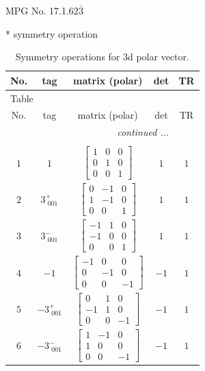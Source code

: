 \documentclass[fleqn,8pt]{jsarticle}
\begin{document}
\setcounter{MaxMatrixCols}{32}

\renewcommand{\tablename}{Table~}
\renewcommand{\figurename}{Figure~}
\begin{center}
\LARGE
MPG No. 17.1.62\quad$\bar{3}$
\end{center}
* symmetry operation
\renewcommand{\arraystretch}{1.3}
\begin{longtable}{ccccc}
\caption{Symmetry operations for 3d polar vector.}
 \\
 \hline \hline
No. & tag & matrix (polar) & det & TR \\ \hline \endfirsthead

\multicolumn{4}{l}{\tablename\ \thetable{}} \\
 \hline \hline
No. & tag & matrix (polar) & det & TR \\ \hline \endhead

 \hline \hline
\multicolumn{4}{r}{\footnotesize\it continued ...} \\ \endfoot

 \hline \hline
\multicolumn{4}{r}{} \\ \endlastfoot

$ 1 $ & $ 1 $ & $ \begin{bmatrix} 1 & 0 & 0 \\ 0 & 1 & 0 \\ 0 & 0 & 1 \end{bmatrix} $ & $ 1 $ & $ 1 $ \\ \hline
$ 2 $ & $ 3^{+}_{\,\,001} $ & $ \begin{bmatrix} 0 & -1 & 0 \\ 1 & -1 & 0 \\ 0 & 0 & 1 \end{bmatrix} $ & $ 1 $ & $ 1 $ \\ \hline
$ 3 $ & $ 3^{-}_{\,\,001} $ & $ \begin{bmatrix} -1 & 1 & 0 \\ -1 & 0 & 0 \\ 0 & 0 & 1 \end{bmatrix} $ & $ 1 $ & $ 1 $ \\ \hline
$ 4 $ & $ -1 $ & $ \begin{bmatrix} -1 & 0 & 0 \\ 0 & -1 & 0 \\ 0 & 0 & -1 \end{bmatrix} $ & $ -1 $ & $ 1 $ \\ \hline
$ 5 $ & $ -3^{+}_{\,\,001} $ & $ \begin{bmatrix} 0 & 1 & 0 \\ -1 & 1 & 0 \\ 0 & 0 & -1 \end{bmatrix} $ & $ -1 $ & $ 1 $ \\ \hline
$ 6 $ & $ -3^{-}_{\,\,001} $ & $ \begin{bmatrix} 1 & -1 & 0 \\ 1 & 0 & 0 \\ 0 & 0 & -1 \end{bmatrix} $ & $ -1 $ & $ 1 $ \\
\end{longtable}
\end{document}
